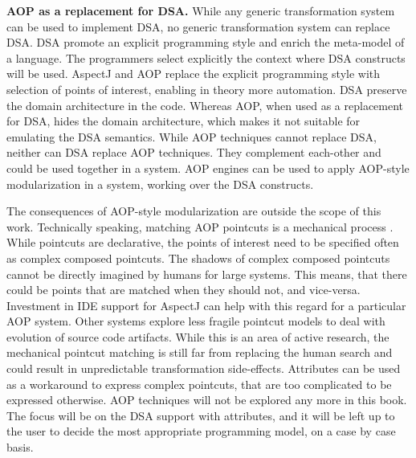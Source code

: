 \begin{itemize}

\end{itemize}

\noindent \textbf{AOP as a replacement for DSA.} While any generic transformation system can be used to implement DSA, no generic transformation system can replace DSA. DSA promote an explicit programming style and enrich the meta-model of a language. The programmers select explicitly the context where DSA constructs will be used. AspectJ and AOP replace the explicit programming style with selection of points of interest, enabling in theory more automation. DSA preserve the domain architecture in the code. Whereas AOP, when used as a replacement for DSA, hides the domain architecture, which makes it not suitable for emulating the DSA semantics. While AOP techniques cannot replace DSA, neither can DSA replace AOP techniques. They complement each-other and could be used together in a system. AOP engines can be used to apply AOP-style modularization in a system, working over the DSA constructs.

The consequences of AOP-style modularization are outside the scope of this work. Technically speaking, matching AOP pointcuts is a mechanical process . While pointcuts are declarative, the points of interest need to be specified often as complex composed pointcuts. The shadows of complex composed pointcuts cannot be directly imagined by humans for large systems. This means, that there could be points that are matched when they should not, and vice-versa. Investment in IDE support for AspectJ can help with this regard for a particular AOP system. Other systems \cite{alpha.05} explore less fragile pointcut models to deal with evolution of source code artifacts. While this is an area of active research, the mechanical pointcut matching is still far from replacing the human search and could result in unpredictable transformation side-effects. Attributes can be used as a workaround to express complex pointcuts, that are too complicated to be expressed otherwise. AOP techniques will not be explored any more in this book. The focus will be on the DSA support with attributes, and it will be left up to the user to decide the most appropriate programming model, on a case by case basis.

